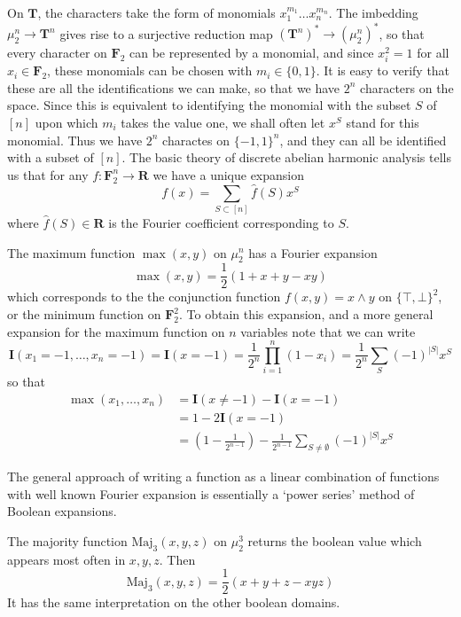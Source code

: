 On $\mathbf{T}$, the characters take the form of monomials $x_1^{m_1} \dots x_n^{m_n}$. The imbedding $\mu^n_2 \to \mathbf{T}^n$ gives rise to a surjective reduction map $(\mathbf{T}^n)^* \to (\mu_2^n)^*$, so that every character on $\mathbf{F}_2$ can be represented by a monomial, and since $x_i^2 = 1$ for all $x_i \in \mathbf{F}_2$, these monomials can be chosen with $m_i \in \{ 0, 1 \}$. It is easy to verify that these are all the identifications we can make, so that we have $2^n$ characters on the space. Since this is equivalent to identifying the monomial with the subset $S$ of $[n]$ upon which $m_i$ takes the value one, we shall often let $x^S$ stand for this monomial. Thus we have $2^n$ charactes on $\{ -1, 1 \}^n$, and they can all be identified with a subset of $[n]$. The basic theory of discrete abelian harmonic analysis tells us that for any $f: \mathbf{F}_2^n \to \mathbf{R}$ we have a unique expansion
%
\[ f(x) = \sum_{S \subset [n]} \widehat{f}(S) x^S \]
%
where $\widehat{f}(S) \in \mathbf{R}$ is the Fourier coefficient corresponding to $S$.

\begin{example}
    The maximum function $\max(x,y)$ on $\mu_2^n$ has a Fourier expansion
    \[ \max(x,y) = \frac{1}{2} \left( 1 + x + y - xy \right) \]
    which corresponds to the the conjunction function $f(x,y) = x \wedge y$ on $\{ \top, \bot \}^2$, or the minimum function on $\mathbf{F}_2^2$. To obtain this expansion, and a more general expansion for the maximum function on $n$ variables note that we can write
    \[ \mathbf{I}(x_1 = -1, \dots, x_n = -1) = \mathbf{I}(x = -1) = \frac{1}{2^n} \prod_{i = 1}^n (1 - x_i) = \frac{1}{2^n} \sum_S (-1)^{|S|} x^S \]
    so that
    \begin{align*}
        \max(x_1, \dots, x_n) &= \mathbf{I}(x \neq -1) - \mathbf{I}(x = -1)\\
        &= 1 - 2 \mathbf{I}(x = -1)\\
        &= \left(1 - \frac{1}{2^{n-1}} \right) - \frac{1}{2^{n-1}} \sum_{S \neq \emptyset} (-1)^{|S|} x^S
    \end{align*}
\end{example}

The general approach of writing a function as a linear combination of functions with well known Fourier expansion is essentially a `power series' method of Boolean expansions.

\begin{example}
    The majority function $\text{Maj}_3(x,y,z)$ on $\mu_2^3$ returns the boolean value which appears most often in $x,y,z$. Then
    \[ \text{Maj}_3(x,y,z) = \frac{1}{2} \left( x + y + z - xyz \right) \]
    It has the same interpretation on the other boolean domains.
\end{example}

